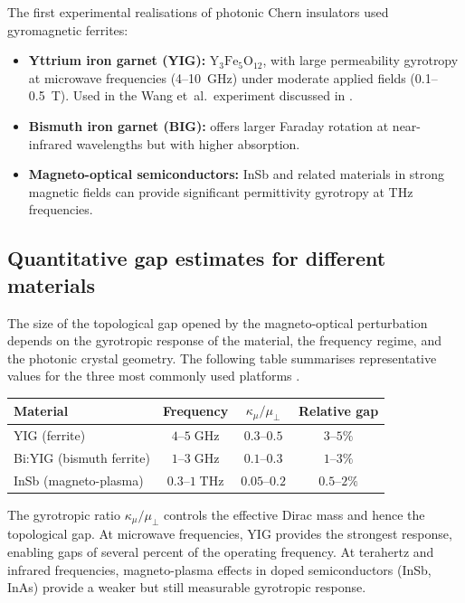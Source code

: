 The first experimental realisations of photonic Chern insulators used
gyromagnetic ferrites:
\begin{itemize}
  \item \textbf{Yttrium iron garnet (YIG):} $\mathrm{Y_3Fe_5O_{12}}$,
  with large permeability gyrotropy at microwave frequencies
  (4--10~GHz) under moderate applied fields (0.1--0.5~T).  Used in
  the Wang et~al.\ experiment discussed in
   \cite{nature2026observation}.
  \item \textbf{Bismuth iron garnet (BIG):} offers larger Faraday
  rotation at near-infrared wavelengths but with higher absorption.
  \item \textbf{Magneto-optical semiconductors:} InSb and related
  materials in strong magnetic fields can provide significant
  permittivity gyrotropy at THz frequencies.
\end{itemize}

\subsection{Quantitative gap estimates for different materials}
\label{sec:ch7-gap-estimates}

The size of the topological gap opened by the magneto-optical
perturbation depends on the gyrotropic response of the material, the
frequency regime, and the photonic crystal geometry.  The following
table summarises representative values for the three most commonly used
platforms \cite{ozawa2018topological,haldane2008possible}.

\begin{center}
\begin{tabular}{lccc}
  \toprule
  \textbf{Material} & \textbf{Frequency} & $\kappa_\mu/\mu_\perp$
    & \textbf{Relative gap} \\
  \midrule
  YIG (ferrite) & $4$--$5\;\mathrm{GHz}$ & $0.3$--$0.5$ &
    $3$--$5\%$ \\
  Bi:YIG (bismuth ferrite) & $1$--$3\;\mathrm{GHz}$ & $0.1$--$0.3$ &
    $1$--$3\%$ \\
  InSb (magneto-plasma) & $0.3$--$1\;\mathrm{THz}$ & $0.05$--$0.2$ &
    $0.5$--$2\%$ \\
  \bottomrule
\end{tabular}
\end{center}

The gyrotropic ratio $\kappa_\mu/\mu_\perp$ controls the effective
Dirac mass and hence the topological gap.  At microwave frequencies,
YIG provides the strongest response, enabling gaps of several percent
of the operating frequency.  At terahertz and infrared frequencies,
magneto-plasma effects in doped semiconductors (InSb, InAs) provide a
weaker but still measurable gyrotropic response.

